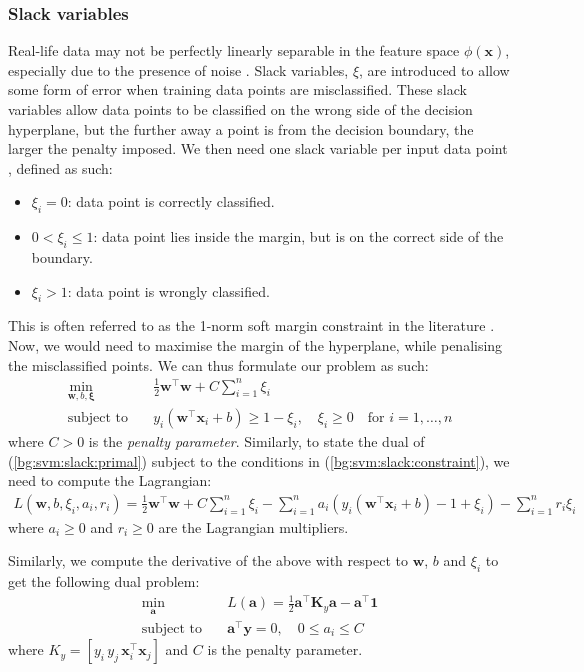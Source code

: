 \documentclass[12pt, twoside, a4paper]{article}
\def\vec{\boldsymbol}
\begin{document}
\subsubsection{Slack variables}
Real-life data may not be perfectly linearly separable in the feature space $\phi(\vec{x})$, especially due to the presence of noise \cite{RefWorks:127}. Slack variables, $\xi$, are introduced to allow some form of error when training data points are misclassified. These slack variables allow data points to be classified on the wrong side of the decision hyperplane, but the further away a point is from the decision boundary, the larger the penalty imposed. We then need one slack variable per input data point \cite{RefWorks:126}, defined as such:
\begin{itemize}
\item $\xi_i = 0$: data point is correctly classified.
\item $0 < \xi_i \leq 1$: data point lies inside the margin, but is on the correct side of the boundary.
\item $\xi_i > 1$: data point is wrongly classified.
\end{itemize}

This is often referred to as the 1-norm soft margin constraint in the literature \cite{RefWorks:127}. Now, we would need to maximise the margin of the hyperplane, while penalising the misclassified points. We can thus formulate our problem as such:
\begin{align}
\min_{\vec{w}, b, \vec{\xi}} \quad &\frac{1}{2}\vec{w}^\top \vec{w} + C \sum_{i=1}^n \xi_i \label{bg:svm:slack:primal} \\
\text{subject to} \quad &y_i(\vec{w}^\top \vec{x}_i + b) \geq 1 - \xi_i , \quad 
\xi_i \geq 0 \quad \text{for $i = 1, \dots , n$}\label{bg:svm:slack:constraint}
\end{align}
where $C>0$ is the \textit{penalty parameter}. Similarly, to state the dual of (\ref{bg:svm:slack:primal}) subject to the conditions in (\ref{bg:svm:slack:constraint}), we need to compute the Lagrangian:
\begin{align*}
L(\vec{w}, b, \xi_i, a_i, r_i) =
\frac{1}{2} \vec{w}^\top \vec{w} + C \sum_{i=1}^n \xi_i - \sum_{i=1}^n a_i(y_i(\vec{w}^\top \vec{x}_i + b) - 1 + \xi_i) - \sum_{i=1}^n r_i\xi_i
\end{align*}
where $a_i \geq 0$ and $r_i \geq 0$ are the Lagrangian multipliers.

Similarly, we compute the derivative of the above with respect to $\vec{w}$, $b$ and $\xi_i$ to get the following dual problem:
\begin{align}
\min_{\vec{a}} \quad &L(\vec{a}) = \frac{1}{2}\vec{a}^\top \vec{K}_y \vec{a} - \vec{a}^\top \vec{1} \label{bg:svm:quadprob} \\
\text{subject to} \quad &\vec{a}^\top \vec{y} = 0, \quad 0 \leq a_i \leq C 
\end{align}
where $K_y = [y_i \, y_j \, \vec{x}_i^\top \vec{x}_j]$ and $C$ is the penalty parameter.
\end{document}
